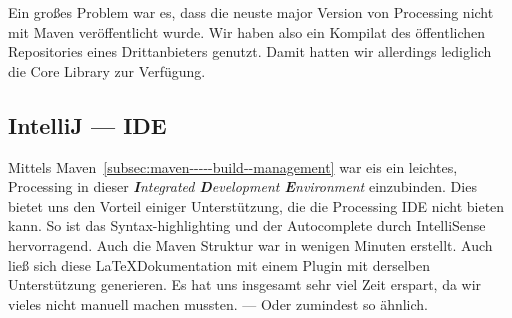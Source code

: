 Ein großes Problem war es, dass die neuste major Version von Processing nicht mit Maven veröffentlicht wurde.
Wir haben also ein Kompilat des öffentlichen Repositories eines Drittanbieters genutzt.
Damit hatten wir allerdings lediglich die Core Library zur Verfügung.


\subsection{IntelliJ --- IDE}\label{subsec:intellij-----ide}
Mittels Maven~\ref{subsec:maven-----build--management} war eis ein leichtes, Processing in dieser \textit{\textbf{I}ntegrated \textbf{D}evelopment \textbf{E}nvironment} einzubinden.
Dies bietet uns den Vorteil einiger Unterstützung, die die Processing IDE nicht bieten kann.
So ist das Syntax-highlighting und der Autocomplete durch IntelliSense hervorragend.
Auch die Maven Struktur war in wenigen Minuten erstellt.
Auch ließ sich diese \LaTeX Dokumentation mit einem Plugin mit derselben Unterstützung generieren.
Es hat uns insgesamt sehr viel Zeit erspart, da wir vieles nicht manuell machen mussten.
 --- Oder zumindest so ähnlich.